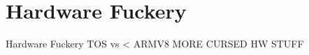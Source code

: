 \section[Hardware Fuckery]{Hardware Fuckery}
\begin{frame}{Hardware Fuckery}
  TOS vs < ARMV8
  MORE CURSED HW STUFF
\end{frame}

